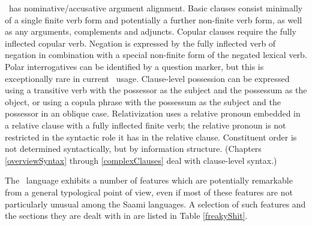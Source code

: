 \PS\ has nominative/accusative argument alignment. 
Basic clauses consist minimally of a single finite verb form and potentially a further non-finite verb form, %
as well as any arguments, complements and adjuncts. Copular clauses require the fully inflected copular verb. Negation is expressed by the fully inflected verb of negation in combination with a special non-finite form of the negated lexical verb. Polar interrogatives can be identified by a question marker, but this is exceptionally rare in current \PS\ usage. Clause-level possession can be expressed using a transitive verb with the possessor as the subject and the possessum as the object, or using a copula phrase with the possessum as the subject and the possessor in an oblique case. Relativization uses a relative pronoun embedded in a relative clause with a fully inflected finite verb; the relative pronoun is not restricted in the syntactic role it has in the relative clause. Constituent order is not determined syntactically, but by information structure. (Chapters \ref{overviewSyntax} through \ref{complexClauses} deal with clause-level syntax.) 

The \PS\ language exhibits a number of features which are potentially remarkable from a general typological point of view, even if most of these features are not particularly unusual among the Saami languages. A selection of such features and the sections they are dealt with in are listed in Table \vref{freakyShit}. 

